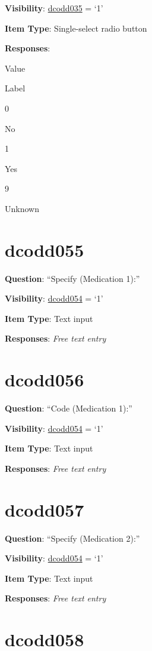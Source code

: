 \documentclass[]{book}
\begin{document}
\textbf{Visibility}: \protect\hyperlink{dcodd035}{dcodd035} = `1'

\textbf{Item Type}: Single-select radio button

\textbf{Responses}:

Value

Label

0

No

1

Yes

9

Unknown

\hypertarget{dcodd055}{%
\section{dcodd055}\label{dcodd055}}

\textbf{Question}: ``Specify (Medication 1):''

\textbf{Visibility}: \protect\hyperlink{dcodd054}{dcodd054} = `1'

\textbf{Item Type}: Text input

\textbf{Responses}: \emph{Free text entry}

\hypertarget{dcodd056}{%
\section{dcodd056}\label{dcodd056}}

\textbf{Question}: ``Code (Medication 1):''

\textbf{Visibility}: \protect\hyperlink{dcodd054}{dcodd054} = `1'

\textbf{Item Type}: Text input

\textbf{Responses}: \emph{Free text entry}

\hypertarget{dcodd057}{%
\section{dcodd057}\label{dcodd057}}

\textbf{Question}: ``Specify (Medication 2):''

\textbf{Visibility}: \protect\hyperlink{dcodd054}{dcodd054} = `1'

\textbf{Item Type}: Text input

\textbf{Responses}: \emph{Free text entry}

\hypertarget{dcodd058}{%
\section{dcodd058}\label{dcodd058}}
\end{document}
